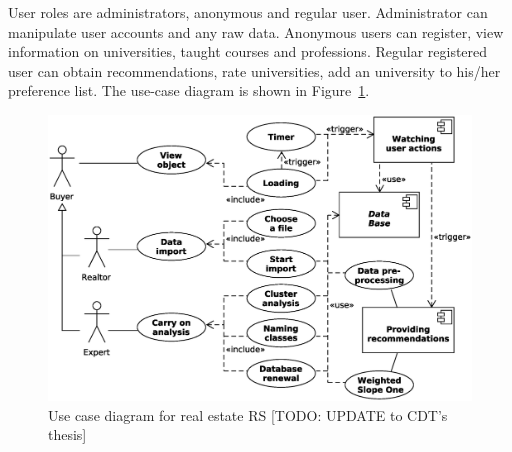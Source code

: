 \documentclass[conference,a4]{IEEEtran}
\begin{document}
User roles are administrators, anonymous and regular user.  Administrator can manipulate user accounts and any raw data.  Anonymous users can register, view information on universities, taught courses and professions.  Regular registered user can obtain recommendations, rate universities, add an university to his/her preference list.  The use-case diagram is shown in Figure~\ref{fig:use-case}.
\begin{figure}[tb]
  \centering
  \includegraphics[width=\linewidth]{use_case.eps}
  \caption{Use case diagram for real estate RS [TODO: UPDATE to CDT's thesis]}  %
  \label{fig:use-case}
\end{figure}
\end{document}
